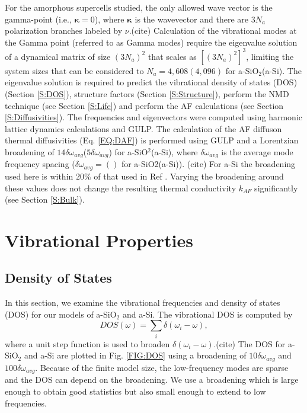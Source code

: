 \documentclass[aps,prb,twocolumn,superscriptaddress,footinbib,amsmath,amssymb,floatfix]{revtex4}
\begin{document}
For the amorphous supercells studied,
the only allowed wave vector is the gamma-point (i.e., $\pmb{\kappa}=0$),  
where $\pmb{\kappa}$ is the wavevector and there are $3N_a$ polarization 
branches labeled by $\nu$.(cite) 
Calculation of the 
vibrational modes at the Gamma point (referred to as Gamma modes) 
require the eigenvalue solution 
of a dynamical matrix of size 
$(3N_a)^2$ that scales as $[(3N_a)^2]^3$, limiting the system 
sizes that can be considered to $N_a = 4,608(4,096)$ for 
a-SiO$_2$(a-Si). 
The eigenvalue solution is required to predict the vibrational 
density of states (DOS) (Section \ref{S:DOS}), structure factors 
(Section \ref{S:Structure}), perform the NMD technique  
(see Section \ref{S:Life})  
and perform the AF calculations (see Section \ref{S:Diffusivities}). 
The frequencies and eigenvectors were computed using harmonic
lattice dynamics calculations and GULP.\cite{gale_general_2003} 
The calculation of the AF diffuson thermal diffusivities 
(Eq. \eqref{EQ:DAF}) 
is performed using GULP and a Lorentzian 
broadening of $14\delta\omega_{avg}$($5\delta\omega_{avg}$) for 
a-SiO$^2$(a-Si), where $\delta\omega_{avg}$ is the average mode 
frequency spacing ($\delta\omega_{avg} = ()$ for a-SiO2(a-Si)).
(cite) For a-Si the broadening used here is within 
$20\%$ of that used 
in Ref . 
Varying the broadening around these values does not 
change the resulting thermal conductivity $k_{AF}$ significantly 
(see Section \ref{S:Bulk}). 

\section{\label{S:Vibrational}Vibrational Properties}

\subsection{\label{S:DOS}Density of States}

In this section, we examine the vibrational frequencies and 
density of states (DOS) for our models of a-SiO$_2$ and a-Si. 
The vibrational DOS is computed by 
\begin{equation}\label{EQ:DOS}
DOS(\omega) = \sum_i \delta(\omega_i - \omega),
\end{equation}
where a unit step function is used to broaden 
$\delta(\omega_i - \omega)$.(cite)  
The DOS for a-SiO$_2$ and a-Si are plotted in Fig. \ref{FIG:DOS} 
using a broadening of $10\delta\omega_{avg}$ and $100\delta\omega_{avg}$.  
Because of the finite model size, the low-frequency modes are sparse and 
the DOS can depend on the broadening.
\cite{feldman_numerical_1999} We use a broadening which is large enough 
to obtain good statistics but also small enough to extend 
to low frequencies.  
\end{document}

